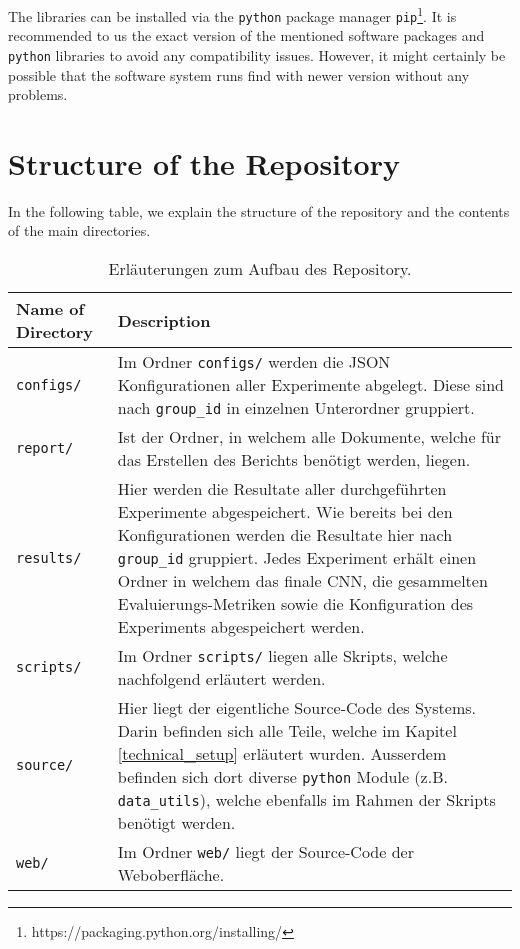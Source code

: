 The libraries can be installed via the \texttt{python} package manager \texttt{pip}\footnote{https://packaging.python.org/installing/}. It is recommended to us the exact version of the mentioned software packages and \texttt{python} libraries to avoid any compatibility issues. However, it might certainly be possible that the software system runs find with newer version without any problems.

\clearpage
\section{Structure of the Repository}
In the following table, we explain the structure of the repository and the contents of the main directories.

\begin{table}[H]
	\centering
	\begin{tabularx}{\textwidth}{lX}
		\toprule
		Name of Directory & Description\\ \midrule
		\texttt{configs/} & Im Ordner \texttt{configs/} werden die JSON Konfigurationen aller Experimente abgelegt. Diese sind nach \texttt{group{\_}id} in einzelnen Unterordner gruppiert.\\
		\texttt{report/} & Ist der Ordner, in welchem alle Dokumente, welche für das Erstellen des Berichts benötigt werden, liegen.\\
		\texttt{results/} & Hier werden die Resultate aller durchgeführten Experimente abgespeichert. Wie bereits bei den Konfigurationen werden die Resultate hier nach \texttt{group{\_}id} gruppiert. Jedes Experiment erhält einen Ordner in welchem das finale CNN, die gesammelten Evaluierungs-Metriken sowie die Konfiguration des Experiments abgespeichert werden.\\
		\texttt{scripts/} & Im Ordner \texttt{scripts/} liegen alle Skripts, welche nachfolgend erläutert werden.\\
		\texttt{source/} & Hier liegt der eigentliche Source-Code des Systems. Darin befinden sich alle Teile, welche im Kapitel \ref{technical_setup} erläutert wurden. Ausserdem befinden sich dort diverse \texttt{python} Module (z.B. \texttt{data{\_}utils}), welche ebenfalls im Rahmen der Skripts benötigt werden.\\
		\texttt{web/} & Im Ordner \texttt{web/} liegt der Source-Code der Weboberfläche.\\
		\bottomrule
	\end{tabularx}
	\caption{Erläuterungen zum Aufbau des Repository.}
\end{table}

